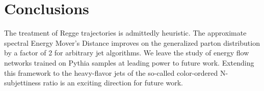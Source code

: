 \section{Conclusions}\label{sec:conclusions}

The treatment of Regge trajectories is admittedly heuristic. The
approximate spectral Energy Mover's Distance improves on the generalized
parton distribution by a factor of 2 for arbitrary jet algorithms. We
leave the study of energy flow networks trained on Pythia samples at
leading power to future work. Extending this framework to the
heavy-flavor jets of the so-called color-ordered N-subjettiness ratio is
an exciting direction for future work.

